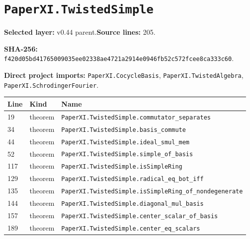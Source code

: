 \documentclass[10pt,oneside]{book}
\begin{document}
\section{\texorpdfstring{\nolinkurl{PaperXI.TwistedSimple}}{PaperXI.TwistedSimple}}\label{module:PaperXI.TwistedSimple}

\textbf{Selected layer:} v0.44 parent.\quad\textbf{Source lines:} 205.\par\textbf{SHA-256:} {\scriptsize\nolinkurl{f420d05bd41765009035ee02338ae4721a2914e0946fb52c572fcee8ca333c60}}.


\textbf{Direct project imports:} \nolinkurl{PaperXI.CocycleBasis}, \nolinkurl{PaperXI.TwistedAlgebra}, \nolinkurl{PaperXI.SchrodingerFourier}.

\begin{longtable}{@{}p{}p{}p{}@{}}\toprule Line&Kind&Name\\\midrule\endhead

19&theorem&\nolinkurl{PaperXI.TwistedSimple.commutator_separates}\\

34&theorem&\nolinkurl{PaperXI.TwistedSimple.basis_commute}\\

44&theorem&\nolinkurl{PaperXI.TwistedSimple.ideal_smul_mem}\\

52&theorem&\nolinkurl{PaperXI.TwistedSimple.simple_of_basis}\\

117&theorem&\nolinkurl{PaperXI.TwistedSimple.isSimpleRing}\\

129&theorem&\nolinkurl{PaperXI.TwistedSimple.radical_eq_bot_iff}\\

135&theorem&\nolinkurl{PaperXI.TwistedSimple.isSimpleRing_of_nondegenerate}\\

144&theorem&\nolinkurl{PaperXI.TwistedSimple.diagonal_mul_basis}\\

157&theorem&\nolinkurl{PaperXI.TwistedSimple.center_scalar_of_basis}\\

189&theorem&\nolinkurl{PaperXI.TwistedSimple.center_eq_scalars}\\

\bottomrule\end{longtable}
\end{document}
